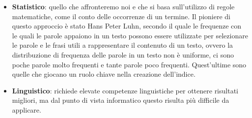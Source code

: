 \begin{itemize}
	\item \textbf{Statistico}: quello che affronteremo noi e che si basa sull'utilizzo di regole matematiche, come il conto delle occorrenze di un termine. Il pioniere di questo approccio è stato Hans Peter Luhn, secondo il quale le frequenze con le quali le parole appaiono in un testo possono essere utilizzate per selezionare le parole e le frasi utili a rappresentare il contenuto di un testo, ovvero la distribuzione di frequenza delle parole in un testo non è uniforme, ci sono poche parole molto frequenti e tante parole poco frequenti. Quest'ultime sono quelle che giocano un ruolo chiave nella creazione dell'indice.
	\item \textbf{Linguistico}: richiede elevate competenze linguistiche per ottenere risultati migliori, ma dal punto di vista informatico questo risulta più difficile da applicare.
\end{itemize}













